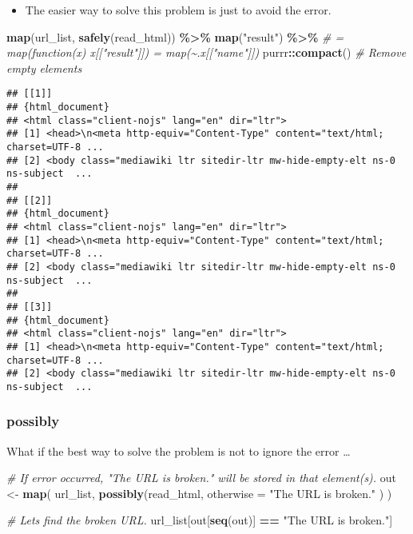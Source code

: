 \documentclass[
]{book}
\newenvironment{Shaded}{\begin{snugshade}}{\end{snugshade}}
\newcommand{\CommentTok}[1]{\textcolor[rgb]{0.56,0.35,0.01}{\textit{#1}}}
\newcommand{\DataTypeTok}[1]{\textcolor[rgb]{0.13,0.29,0.53}{#1}}
\newcommand{\KeywordTok}[1]{\textcolor[rgb]{0.13,0.29,0.53}{\textbf{#1}}}
\newcommand{\NormalTok}[1]{#1}
\newcommand{\OperatorTok}[1]{\textcolor[rgb]{0.81,0.36,0.00}{\textbf{#1}}}
\newcommand{\StringTok}[1]{\textcolor[rgb]{0.31,0.60,0.02}{#1}}
\providecommand{\tightlist}{%
  \setlength{\itemsep}{0pt}\setlength{\parskip}{0pt}}
\begin{document}
\begin{itemize}
\tightlist
\item
  The easier way to solve this problem is just to avoid the error.
\end{itemize}

\begin{Shaded}
\begin{Highlighting}[]
\KeywordTok{map}\NormalTok{(url\_list, }\KeywordTok{safely}\NormalTok{(read\_html)) }\OperatorTok{\%\textgreater{}\%}
\StringTok{  }\KeywordTok{map}\NormalTok{(}\StringTok{"result"}\NormalTok{) }\OperatorTok{\%\textgreater{}\%}\StringTok{ }
\StringTok{  }\CommentTok{\# = map(function(x) x[["result"]]) = map(\textasciitilde{}.x[["name"]])}
\StringTok{  }\NormalTok{purrr}\OperatorTok{::}\KeywordTok{compact}\NormalTok{() }\CommentTok{\# Remove empty elements}
\end{Highlighting}
\end{Shaded}

\begin{verbatim}
## [[1]]
## {html_document}
## <html class="client-nojs" lang="en" dir="ltr">
## [1] <head>\n<meta http-equiv="Content-Type" content="text/html; charset=UTF-8 ...
## [2] <body class="mediawiki ltr sitedir-ltr mw-hide-empty-elt ns-0 ns-subject  ...
## 
## [[2]]
## {html_document}
## <html class="client-nojs" lang="en" dir="ltr">
## [1] <head>\n<meta http-equiv="Content-Type" content="text/html; charset=UTF-8 ...
## [2] <body class="mediawiki ltr sitedir-ltr mw-hide-empty-elt ns-0 ns-subject  ...
## 
## [[3]]
## {html_document}
## <html class="client-nojs" lang="en" dir="ltr">
## [1] <head>\n<meta http-equiv="Content-Type" content="text/html; charset=UTF-8 ...
## [2] <body class="mediawiki ltr sitedir-ltr mw-hide-empty-elt ns-0 ns-subject  ...
\end{verbatim}

\hypertarget{possibly}{%
\subsubsection{possibly}\label{possibly}}

What if the best way to solve the problem is not to ignore the error \ldots{}

\begin{Shaded}
\begin{Highlighting}[]
\CommentTok{\# If error occurred, "The URL is broken." will be stored in that element(s).}
\NormalTok{out \textless{}{-}}\StringTok{ }\KeywordTok{map}\NormalTok{(}
\NormalTok{  url\_list,}
  \KeywordTok{possibly}\NormalTok{(read\_html,}
    \DataTypeTok{otherwise =} \StringTok{"The URL is broken."}
\NormalTok{  )}
\NormalTok{)}

\CommentTok{\# Let\textquotesingle{}s find the broken URL.}
\NormalTok{url\_list[out[}\KeywordTok{seq}\NormalTok{(out)] }\OperatorTok{==}\StringTok{ "The URL is broken."}\NormalTok{]}
\end{Highlighting}
\end{Shaded}
\end{document}
